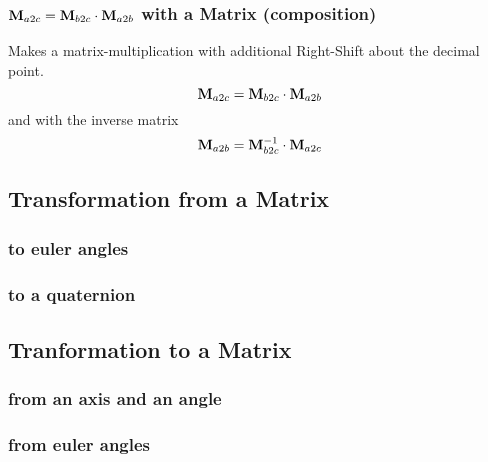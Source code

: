 \subsubsection*{$\mathbf{M}_{a2c} = \mathbf{M}_{b2c} \cdot \mathbf{M}_{a2b}$ with a Matrix (composition)}
Makes a matrix-multiplication with additional Right-Shift about the decimal point.
\begin{equation}
\mathbf{M}_{a2c} = \mathbf{M}_{b2c} \cdot \mathbf{M}_{a2b}
\end{equation}
and with the inverse matrix
\begin{equation}
\mathbf{M}_{a2b} = \mathbf{M}_{b2c}^{-1} \cdot \mathbf{M}_{a2c}
\end{equation}


\subsection{Transformation from a Matrix}
\subsubsection*{to euler angles}


\subsubsection*{to a quaternion}




\subsection{Tranformation to a Matrix}
\subsubsection*{from an axis and an angle}


\subsubsection*{from euler angles}


